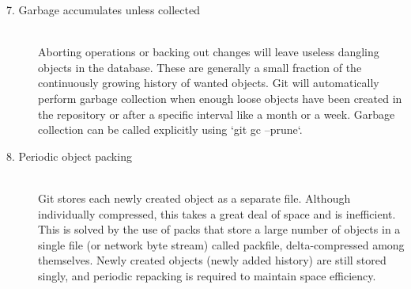 \begin{description}
\item[7. Garbage accumulates unless collected] \hfill \\
  Aborting operations or backing out changes will leave useless
  dangling objects in the database. These are generally a small
  fraction of the continuously growing history of wanted objects. Git
  will automatically perform garbage collection when enough loose
  objects have been created in the repository or after a specific
  interval like a month or a week. Garbage collection can be called
  explicitly using ‘git gc –prune‘.

\item[8. Periodic object packing] \hfill \\
  Git stores each newly created object as a separate file. Although
  individually compressed, this takes a great deal of space and is
  inefficient. This is solved by the use of packs that store a large
  number of objects in a single file (or network byte stream) called
  packfile, delta-compressed among themselves. Newly created objects
  (newly added history) are still stored singly, and periodic
  repacking is required to maintain space efficiency.

\end{description}
